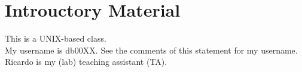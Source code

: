 








\chapter{Introuctory Material}
\label{chp:SWEngrBasics}


This is a UNIX-based class. \\

My username is db00XX. See the comments of this statement for my username. \\ %


Ricardo is my (lab) teaching assistant (TA). \\ 

